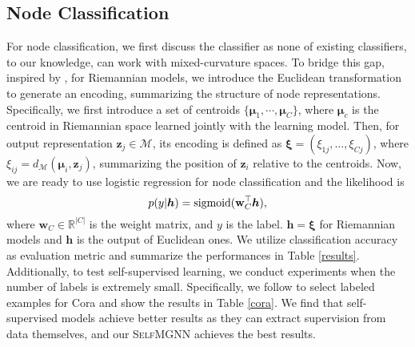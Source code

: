 \subsection{Node Classification}
For node classification, we first discuss the classifier as none of existing classifiers, to our knowledge, can work with mixed-curvature spaces.
To bridge this gap, inspired by \cite{HGNN}, for Riemannian models, we introduce the Euclidean transformation to generate an encoding, summarizing the structure of node representations.
Specifically, we first introduce a set of centroids $\{\boldsymbol \mu_1,  \cdots, \boldsymbol \mu_C\}$,
where $\boldsymbol \mu_c$ is the centroid in Riemannian space learned jointly with the learning model. %
Then, for output representation $\boldsymbol z_j \in \mathcal M$, its encoding is defined as $\boldsymbol \xi=\left(\xi_{1j}, \ldots, \xi_{Cj}\right) $, where $\xi_{ij}=d_{\mathcal M}(\boldsymbol \mu_i, \boldsymbol z_j)$, summarizing the position of $\boldsymbol z_i $ relative to the centroids.
Now, we are ready to use logistic regression for node classification and the likelihood is 
\vspace{-0.09in}
\begin{equation}
p( y | \boldsymbol h )=\text{sigmoid}(\mathbf w_C^\top \boldsymbol h),
\vspace{-0.07in}
\end{equation}
where $\mathbf w_C \in \mathbb R^{|C|}$ is the weight matrix, and $y$ is the label.
$\boldsymbol h=\boldsymbol \xi$ for Riemannian models and $\boldsymbol h$ is the output of Euclidean ones.
We utilize classification accuracy \cite{kipf2016semi} as evaluation metric and summarize the performances in Table \ref{results}.
Additionally, to test self-supervised learning, we conduct experiments when the number of labels is extremely small.
Specifically, we follow \cite{LiHW18} to select labeled examples for Cora and show the results in Table \ref{cora}.
We find that self-supervised models achieve better results as they can extract supervision from data themselves, and our \textsc{SelfMGNN} achieves the best results.

